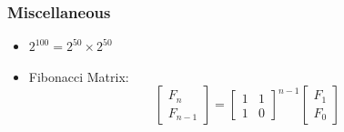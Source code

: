 \subsubsection{Miscellaneous}
\vspace{2.5mm}
\begin{itemize}
    \item $2^{100} = 2^{50} \times 2^{50}$
    \item Fibonacci Matrix: $$\begin{bmatrix} F_n\\ F_{n-1} \end{bmatrix} =
              \begin{bmatrix} 1 & 1\\ 1 & 0 \end{bmatrix}^{n-1}
              \begin{bmatrix} F_1\\ F_0 \end{bmatrix}$$


\end{itemize}
